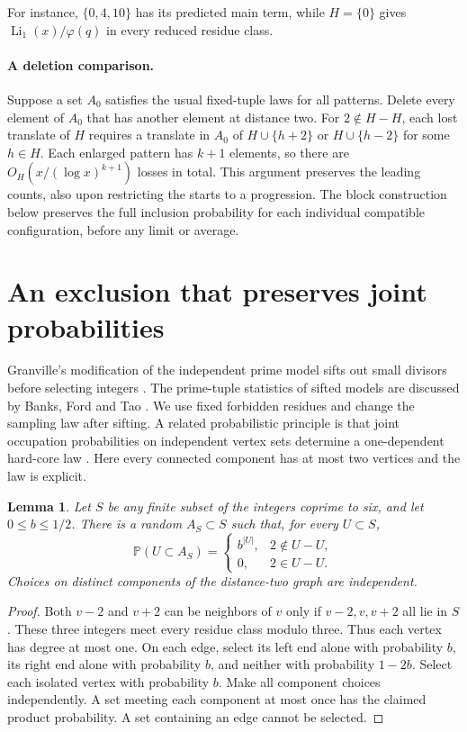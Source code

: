 \documentclass[11pt]{article}
\newtheorem{lemma}[theorem]{Lemma}
\newcommand{\PP}{\mathbb P}
\newcommand{\LiK}{\operatorname{Li}}
\begin{document}
For instance, $\{0,4,10\}$ has its predicted main term, while $H=\{0\}$
gives $\LiK_1(x)/\varphi(q)$ in every reduced residue class.

\paragraph{A deletion comparison.}
Suppose a set $A_0$ satisfies the usual fixed-tuple laws for all
patterns. Delete every element of $A_0$ that has another element at
distance two. For $2\notin H-H$, each lost translate of $H$ requires
a translate in $A_0$ of $H\cup\{h+2\}$ or $H\cup\{h-2\}$ for some
$h\in H$. Each enlarged pattern has $k+1$ elements, so there are
$O_H(x/(\log x)^{k+1})$ losses in total. This argument preserves
the leading counts, also upon restricting the starts to a
progression. The block construction below preserves the full
inclusion probability for each individual compatible configuration,
before any limit or average.

\section{An exclusion that preserves joint probabilities}
Granville's modification of the independent prime model sifts out
small divisors before selecting integers \cite{Granville}. The prime-tuple
statistics of sifted models are discussed by Banks, Ford and Tao
\cite{BFT}. We use fixed forbidden residues and change the sampling
law after sifting. A related probabilistic principle is that joint
occupation probabilities on independent vertex sets determine a
one-dependent hard-core law \cite{HL}. Here every connected component
has at most two vertices and the law is explicit.

\begin{lemma}\label{lem:match}
Let $S$ be any finite subset of the integers coprime to six, and let
$0\le b\le1/2$. There is a random $A_S\subset S$ such that, for every
$U\subset S$,
\[
 \PP(U\subset A_S)=
 \begin{cases}
 b^{|U|}, & 2\notin U-U,\\
 0,       & 2\in U-U.
 \end{cases}
\]
Choices on distinct components of the distance-two graph are independent.
\end{lemma}
\begin{proof}
Both $v-2$ and $v+2$ can be neighbors of $v$ only if $v-2,v,v+2$
all lie in $S$. These three integers meet every residue class modulo
three. Thus each vertex has degree at most one. On each edge, select
its left end alone with probability $b$, its right end alone with
probability $b$, and neither with probability $1-2b$. Select each
isolated vertex with probability $b$. Make all component choices
independently. A set meeting each component at most once has the
claimed product probability. A set containing an edge cannot be selected.
\end{proof}
\end{document}
